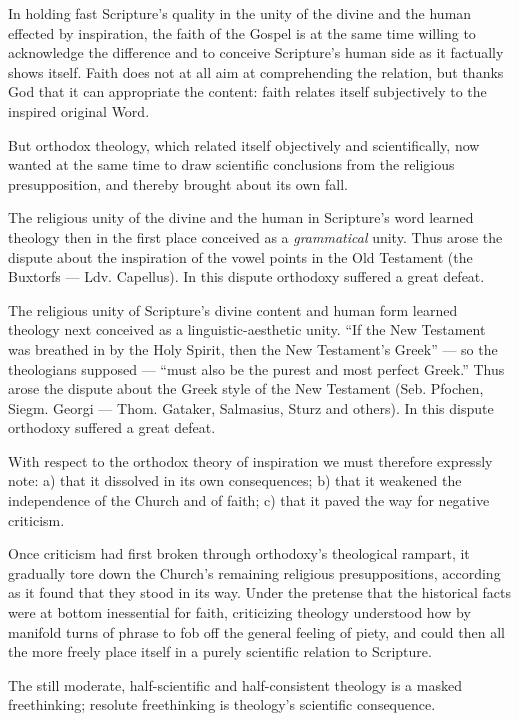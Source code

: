 \documentclass[12pt,a4paper]{book}
\begin{document}
In holding fast Scripture's quality in the
unity of the divine and the human effected by inspiration, the faith of the
Gospel is at the same time willing to acknowledge the difference and to conceive
Scripture's human side as it factually shows itself. Faith does not at all aim at
comprehending the relation, but thanks God that it can appropriate the content:
faith relates itself subjectively to the inspired original Word.

But orthodox theology, which related itself objectively and scientifically, now
wanted at the same time to draw scientific conclusions from the religious
presupposition, and thereby brought about its own fall.

The religious unity of the divine and the human in Scripture's word learned
theology then in the first place conceived as a \textit{grammatical} unity. Thus
arose the dispute about the inspiration of the vowel points in the Old Testament
(the Buxtorfs --- Ldv. Capellus). In this dispute orthodoxy suffered a great
defeat.

The religious unity of Scripture's divine content and human form learned theology
next conceived as a linguistic-aesthetic unity. ``If the New Testament was
breathed in by the Holy Spirit, then the New Testament's Greek'' --- so the
theologians supposed --- ``must also be the purest and most perfect Greek.''
Thus arose the dispute about the Greek style of the New Testament (Seb. Pfochen,
Siegm. Georgi --- Thom. Gataker, Salmasius, Sturz and others). In this dispute
orthodoxy suffered a great defeat.

With respect to the orthodox theory of inspiration we must therefore expressly
note: a) that it dissolved in its own consequences; b) that it weakened the
independence of the Church and of faith; c) that it paved the way for negative
criticism.

Once criticism had first broken through orthodoxy's theological rampart, it
gradually tore down the Church's remaining religious presuppositions, according as
it found that they stood in its way. Under the pretense that the historical facts
were at
bottom inessential for faith, criticizing theology understood how by manifold
turns of phrase to fob off the general feeling of piety, and could then all the
more freely place itself in a purely scientific relation to Scripture.

The still moderate, half-scientific and half-consistent theology is a masked
freethinking; resolute freethinking is theology's scientific consequence.
\end{document}
